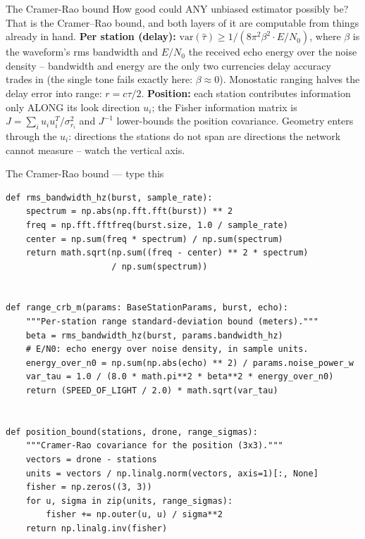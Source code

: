 \documentclass[10pt]{beamer}
\begin{document}
\begin{frame}{The Cramer-Rao bound}
  How good could ANY unbiased estimator possibly be? That
  is the Cramer--Rao bound, and both layers of it are
  computable from things already in hand. \textbf{Per
  station (delay):} $\mathrm{var}(\hat\tau) \geq 1 / (8
  \pi^2 \beta^2 \cdot E/N_0)$, where $\beta$ is the
  waveform's rms bandwidth and $E/N_0$ the received echo
  energy over the noise density -- bandwidth and energy are
  the only two currencies delay accuracy trades in (the
  single tone fails exactly here: $\beta \approx 0$).
  Monostatic ranging halves the delay error into range:
  $r = c\tau/2$. \textbf{Position:} each station
  contributes information only ALONG its look direction
  $u_i$; the Fisher information matrix is $J = \sum_i u_i
  u_i^T / \sigma_{r_i}^2$ and $J^{-1}$ lower-bounds the
  position covariance. Geometry enters through the $u_i$:
  directions the stations do not span are directions the
  network cannot measure -- watch the vertical axis.
\end{frame}

\begin{frame}[fragile]{The Cramer-Rao bound --- type this}
\begin{lstlisting}[basicstyle=\ttfamily\tiny]
def rms_bandwidth_hz(burst, sample_rate):
    spectrum = np.abs(np.fft.fft(burst)) ** 2
    freq = np.fft.fftfreq(burst.size, 1.0 / sample_rate)
    center = np.sum(freq * spectrum) / np.sum(spectrum)
    return math.sqrt(np.sum((freq - center) ** 2 * spectrum)
                     / np.sum(spectrum))


def range_crb_m(params: BaseStationParams, burst, echo):
    """Per-station range standard-deviation bound (meters)."""
    beta = rms_bandwidth_hz(burst, params.bandwidth_hz)
    # E/N0: echo energy over noise density, in sample units.
    energy_over_n0 = np.sum(np.abs(echo) ** 2) / params.noise_power_w
    var_tau = 1.0 / (8.0 * math.pi**2 * beta**2 * energy_over_n0)
    return (SPEED_OF_LIGHT / 2.0) * math.sqrt(var_tau)


def position_bound(stations, drone, range_sigmas):
    """Cramer-Rao covariance for the position (3x3)."""
    vectors = drone - stations
    units = vectors / np.linalg.norm(vectors, axis=1)[:, None]
    fisher = np.zeros((3, 3))
    for u, sigma in zip(units, range_sigmas):
        fisher += np.outer(u, u) / sigma**2
    return np.linalg.inv(fisher)
\end{lstlisting}
\end{frame}
\end{document}

